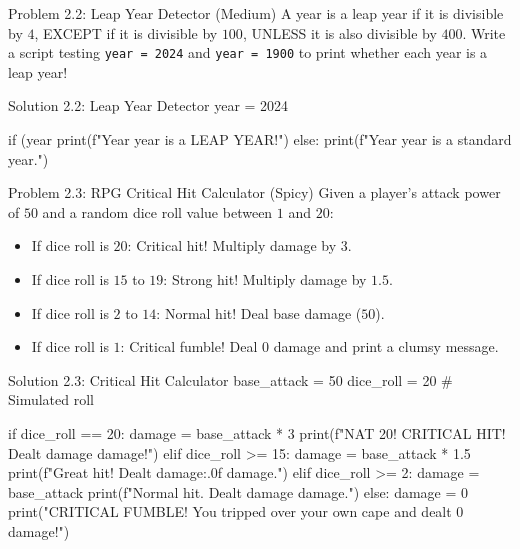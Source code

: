 \begin{snakelab}{Problem 2.2: Leap Year Detector (Medium)}
A year is a leap year if it is divisible by $4$, EXCEPT if it is divisible by $100$, UNLESS it is also divisible by $400$.
Write a script testing \texttt{year = 2024} and \texttt{year = 1900} to print whether each year is a leap year!
\end{snakelab}

\begin{pycode}{Solution 2.2: Leap Year Detector}
year = 2024

if (year %
    print(f"Year {year} is a LEAP YEAR!")
else:
    print(f"Year {year} is a standard year.")
\end{pycode}

\begin{snakelab}{Problem 2.3: RPG Critical Hit Calculator (Spicy)}
Given a player's attack power of $50$ and a random dice roll value between $1$ and $20$:
\begin{itemize}
    \item If dice roll is $20$: Critical hit! Multiply damage by $3$.
    \item If dice roll is $15$ to $19$: Strong hit! Multiply damage by $1.5$.
    \item If dice roll is $2$ to $14$: Normal hit! Deal base damage ($50$).
    \item If dice roll is $1$: Critical fumble! Deal $0$ damage and print a clumsy message.
\end{itemize}
\end{snakelab}

\begin{pycode}{Solution 2.3: Critical Hit Calculator}
base_attack = 50
dice_roll = 20  # Simulated roll

if dice_roll == 20:
    damage = base_attack * 3
    print(f"NAT 20! CRITICAL HIT! Dealt {damage} damage!")
elif dice_roll >= 15:
    damage = base_attack * 1.5
    print(f"Great hit! Dealt {damage:.0f} damage.")
elif dice_roll >= 2:
    damage = base_attack
    print(f"Normal hit. Dealt {damage} damage.")
else:
    damage = 0
    print("CRITICAL FUMBLE! You tripped over your own cape and dealt 0 damage!")
\end{pycode}
